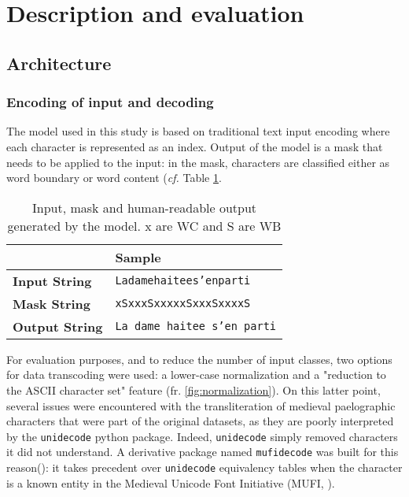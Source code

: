 \documentclass{jdmdh}
\begin{document}
\section{Description and evaluation}

\subsection{Architecture}

\subsubsection{Encoding of input and decoding}

The model used in this study is based on traditional text input encoding where each character is represented as an index. Output of the model is a mask that needs to be applied to the input: in the mask, characters are classified either as word boundary or word content (\textit{cf.} Table \ref{lst:input_output_example}.

\begin{table}[!ht]
\centering
\begin{tabular}{@{}ll@{}}
\hline
                       & \textbf{Sample}           \\  \hline
\textbf{Input  String} & \texttt{Ladamehaitees'enparti}     \\
\textbf{Mask   String} & \texttt{xSxxxSxxxxxSxxxSxxxxS}     \\
\textbf{Output String} & \texttt{La dame haitee s'en parti} \\ \hline
\end{tabular}
  \caption{Input, mask and human-readable output generated by the model. x are WC and S are WB}
  \label{lst:input_output_example}
\end{table}

For evaluation purposes, and to reduce the number of input classes, two options for data transcoding were used: a lower-case normalization and a "reduction to the ASCII character set" feature (fr. \ref{fig:normalization}). On this latter point, several issues were encountered with the transliteration of medieval paelographic characters that were part of the original datasets, as they are poorly interpreted by the \texttt{unidecode} python package. Indeed, \texttt{unidecode} simply removed characters it did not understand. A derivative package named \texttt{mufidecode} was built for this reason(\citet{thibault_clerice_2019_3237731}): it takes precedent over \texttt{unidecode} equivalency tables when the character is a known entity in the Medieval Unicode Font Initiative (MUFI, \citet{mufi}).
\end{document}
